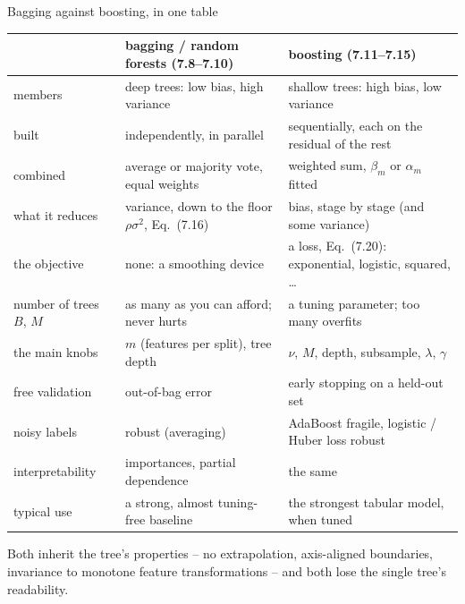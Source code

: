\documentclass[10pt,aspectratio=169]{beamer}
\begin{document}
\begin{frame}{Bagging against boosting, in one table}
\small
\begin{center}
\scriptsize
\begin{tabular}{@{}p{2.4cm}p{5.3cm}p{5.3cm}@{}}
\toprule
 & bagging / random forests (7.8--7.10) & boosting (7.11--7.15)\\
\midrule
members & deep trees: low bias, high variance & shallow trees: high bias, low variance\\
built & independently, in parallel & sequentially, each on the residual of the rest\\
combined & average or majority vote, equal weights & weighted sum, $\beta_m$ or $\alpha_m$ fitted\\
what it reduces & variance, down to the floor $\rho\sigma^2$, Eq.\ (7.16) & bias, stage by stage (and some variance)\\
the objective & none: a smoothing device & a loss, Eq.\ (7.20): exponential, logistic, squared, \dots\\
number of trees $B$, $M$ & as many as you can afford; never hurts & a tuning parameter; too many overfits\\
the main knobs & $m$ (features per split), tree depth & $\nu$, $M$, depth, subsample, $\lambda$, $\gamma$\\
free validation & out-of-bag error & early stopping on a held-out set\\
noisy labels & robust (averaging) & AdaBoost fragile, logistic / Huber loss robust\\
interpretability & importances, partial dependence & the same\\
typical use & a strong, almost tuning-free baseline & the strongest tabular model, when tuned\\
\bottomrule
\end{tabular}
\end{center}
\medskip
Both inherit the tree's properties -- no extrapolation, axis-aligned
boundaries, invariance to monotone feature transformations -- and both lose
the single tree's readability.
\end{frame}
\end{document}
